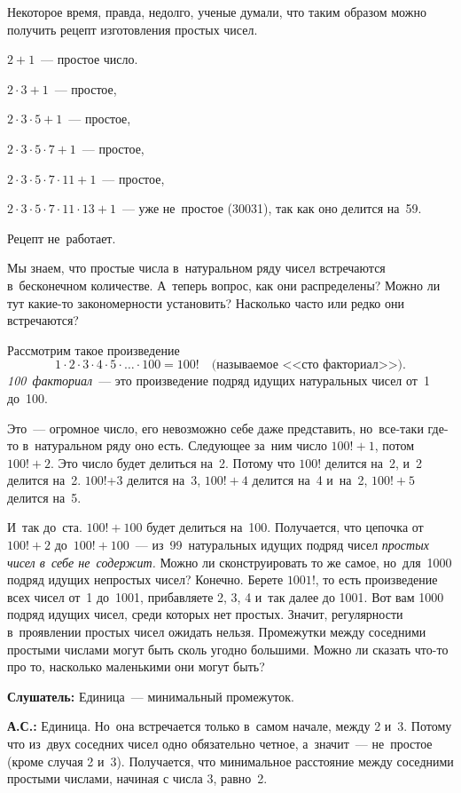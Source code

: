 Некоторое время, правда, недолго, ученые думали, что таким образом можно получить рецепт
изготовления простых чисел.

$2+1$~--- простое число.

$2\cdot3+1$~--- простое,

$2\cdot3\cdot5+1$~--- простое,

$2\cdot3\cdot5\cdot7+1$~--- простое,

$2\cdot3\cdot5\cdot7\cdot11+1$~--- простое,

$2\cdot3\cdot5\cdot7\cdot11\cdot13+1$~--- уже не~простое (30031), так как оно делится на~59.

Рецепт не~работает.

Мы знаем, что простые числа в~натуральном ряду чисел встречаются в~бесконечном количестве. А~теперь
вопрос, как они распределены? Можно ли тут какие-то закономерности установить? Насколько часто или
редко они встречаются?

Рассмотрим такое произведение
$$
1\cdot2\cdot3\cdot4\cdot5\cdot\ldots\cdot100=100!\quad
\text{(называемое <<сто факториал>>)}.
$$
\textit{100~факториал}~--- это произведение подряд идущих натуральных чисел от~1 до~100.

Это~--- огромное число, его невозможно себе даже представить, но~все-таки где-то в~натуральном ряду оно
есть. Следующее за~ним число $100!+1$, потом $100!+2$. Это число будет делиться на~2. Потому что $100!$
делится на~2, и~2 делится на~2. $100!$+3 делится на~3, $100!+4$ делится на~4 и~на~2, $100!+5$ делится
на~5.

И~так до~ста. $100!+100$ будет делиться на~100. Получается, что цепочка от~$100!+2$ до~$100!+100$~--- из~99~натуральных идущих подряд
чисел \textit{простых чисел в~себе не~содержит.}
 Можно ли сконструировать то же самое,
но~для~1000 подряд идущих непростых чисел? Конечно. Берете $1001!$, то есть произведение всех чисел
от~1 до~1001, прибавляете 2, 3, 4 и~так далее до 1001. Вот вам 1000 подряд идущих чисел,
среди которых нет простых. Значит, регулярности в~проявлении простых чисел ожидать нельзя. Промежутки между
соседними простыми числами могут быть сколь угодно большими. Можно ли сказать что-то про то, насколько маленькими
они могут быть?

\textbf{Слушатель:} Единица~--- минимальный промежуток.

\textbf{А.С.:} Единица. Но~она встречается только в~самом начале, между 2 и~3. Потому что из~двух
соседних чисел одно обязательно четное, а~значит~--- не~простое (кроме случая 2 и~3). Получается,
что минимальное расстояние между соседними простыми числами, начиная с числа $3$, равно~2.


